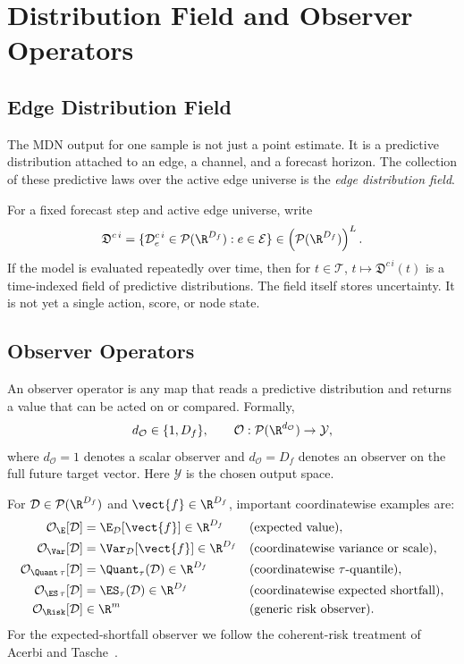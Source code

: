 \newpage{}
\section{Distribution Field and Observer Operators}
\label{sec:distribution-field-and-observer-operators}

\subsection{Edge Distribution Field}
\label{subsec:edge-distribution-field}

The MDN output for one sample is not just a point estimate.  It is a predictive
distribution attached to an edge, a channel, and a forecast horizon.  The
collection of these predictive laws over the active edge universe is the
\emph{edge distribution field}.

For a fixed forecast step and active edge universe, write
\[
  \mathfrak{D}^{c\,i}
  =
  \{\mathcal{D}_{e}^{c\,i} \in \mathcal{P}(\R^{D_f}) : e \in \mathcal{E}\}
  \in
  \left(\mathcal{P}(\R^{D_f})\right)^L.
\]
If the model is evaluated repeatedly over time, then for $t \in \mathcal{T}$,
$t \mapsto \mathfrak{D}^{c\,i}(t)$ is a time-indexed field of predictive
distributions.  The field itself stores uncertainty.  It is not yet a single
action, score, or node state.

\subsection{Observer Operators}
\label{subsec:observer-operators}

An observer operator is any map that reads a predictive distribution and returns
a value that can be acted on or compared.  Formally,
\[
  d_{\mathcal{O}} \in \{1,D_f\},
  \qquad
  \mathcal{O} : \mathcal{P}(\R^{d_{\mathcal{O}}}) \rightarrow \mathcal{Y},
\]
where $d_{\mathcal{O}}=1$ denotes a scalar observer and
$d_{\mathcal{O}}=D_f$ denotes an observer on the full future target vector.
Here $\mathcal{Y}$ is the chosen output space.

For $\mathcal{D} \in \mathcal{P}(\R^{D_f})$ and
$\vect{f} \in \R^{D_f}$, important coordinatewise examples are:
\begin{align*}
  \mathcal{O}_{\E}[\mathcal{D}] &= \E_{\mathcal{D}}[\vect{f}] \in \R^{D_f} &&\text{(expected value)},\\
  \mathcal{O}_{\Var}[\mathcal{D}] &= \Var_{\mathcal{D}}[\vect{f}] \in \R^{D_f} &&\text{(coordinatewise variance or scale)},\\
  \mathcal{O}_{\Quant\,\tau}[\mathcal{D}] &= \Quant_{\tau}(\mathcal{D}) \in \R^{D_f} &&\text{(coordinatewise $\tau$-quantile)},\\
  \mathcal{O}_{\ES\,\tau}[\mathcal{D}] &= \ES_{\tau}(\mathcal{D}) \in \R^{D_f} &&\text{(coordinatewise expected shortfall)},\\
  \mathcal{O}_{\Risk}[\mathcal{D}] &\in \R^m &&\text{(generic risk observer)}.
\end{align*}
For the expected-shortfall observer we follow the coherent-risk treatment of
Acerbi and Tasche~\cite{acerbi2002coherence}.

